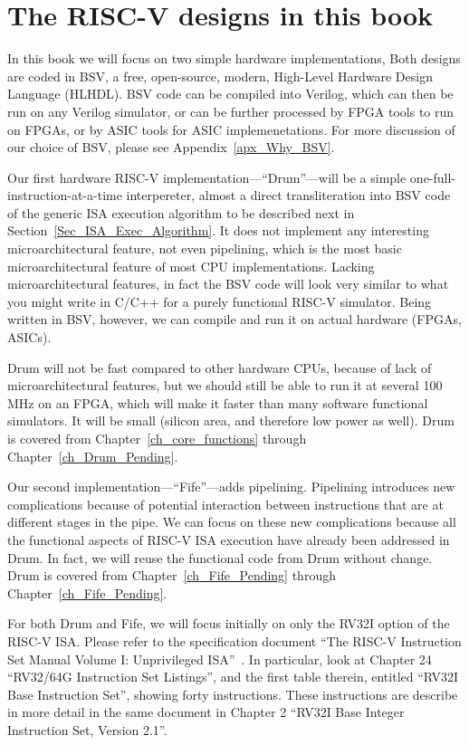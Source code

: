 
\section{The RISC-V designs in this book}

In this book we will focus on two simple hardware implementations,
Both designs are coded in BSV, a free, open-source, modern, High-Level
Hardware Design Language (HLHDL).  BSV code can be compiled into
Verilog, which can then be run on any Verilog simulator, or can be
further processed by FPGA tools to run on FPGAs, or by ASIC tools for
ASIC implemenetations.  For more discussion of our choice of BSV,
please see Appendix~\ref{apx_Why_BSV}.

Our first hardware RISC-V implementation---``Drum''---will be a
simple one-full-instruction-at-a-time interpereter, almost a direct
transliteration into BSV code of the generic ISA execution algorithm
to be described next in Section~\ref{Sec_ISA_Exec_Algorithm}.  It does
not implement any interesting microarchitectural feature, not even
pipelining, which is the most basic microarchitectural feature of most
CPU implementations.  Lacking microarchitectural features, in fact the
BSV code will look very similar to what you might write in C/C++ for a
purely functional RISC-V simulator.  Being written in BSV, however, we
can compile and run it on actual hardware (FPGAs, ASICs).

Drum will not be fast compared to other hardware CPUs, because of lack
of microarchitectural features, but we should still be able to run it
at several 100 MHz on an FPGA, which will make it faster than many
software functional simulators.  It will be small (silicon area, and
therefore low power as well).  Drum is covered from
Chapter~\ref{ch_core_functions} through Chapter~\ref{ch_Drum_Pending}.

Our second implementation---``Fife''---adds pipelining.  Pipelining
introduces new complications because of potential interaction between
instructions that are at different stages in the pipe.  We can focus
on these new complications because all the functional aspects of
RISC-V ISA execution have already been addressed in Drum.  In fact, we
will reuse the functional code from Drum without change.  Drum is
covered from Chapter~\ref{ch_Fife_Pending} through
Chapter~\ref{ch_Fife_Pending}.

For both Drum and Fife, we will focus initially on only the RV32I
option of the RISC-V ISA.  Please refer to the specification document
``The RISC-V Instruction Set Manual Volume I: Unprivileged
ISA''~\cite{RISCV_Unpriv_2019_12_13}.  In particular, look at Chapter
24 ``RV32/64G Instruction Set Listings'', and the first table therein,
entitled ``RV32I Base Instruction Set'', showing forty instructions.
These instructions are describe in more detail in the same document in
Chapter 2 ``RV32I Base Integer Instruction Set, Version 2.1''.

